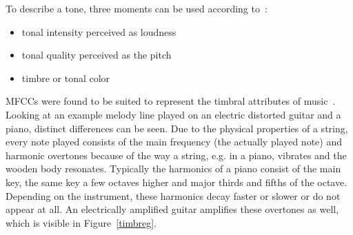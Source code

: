 \FloatBarrier
\noindent To describe a tone, three moments can be used according to~\cite[pp. 15f]{musicdata}: %
\begin{itemize}
	\setlength\itemsep{-0.5em}
	\item tonal intensity perceived as loudness
	\item tonal quality perceived as the pitch 
	\item timbre or tonal color
\end{itemize}

\noindent MFCCs were found to be suited to represent the timbral attributes of music~\cite[pp. 55 ff]{knees1}. Looking at an example melody line played on an electric distorted guitar and a piano, distinct differences can be seen. Due to the physical properties of a string, every note played consists of the main frequency (the actually played note) and harmonic overtones because of the way a string, e.g. in a piano, vibrates and the wooden body resonates. Typically the harmonics of a piano consist of the main key, the same key a few octaves higher and major thirds and fifths of the octave. Depending on the instrument, these harmonics decay faster or slower or do not appear at all. An electrically amplified guitar amplifies these overtones as well, which is visible in Figure~\ref{timbreg}.

